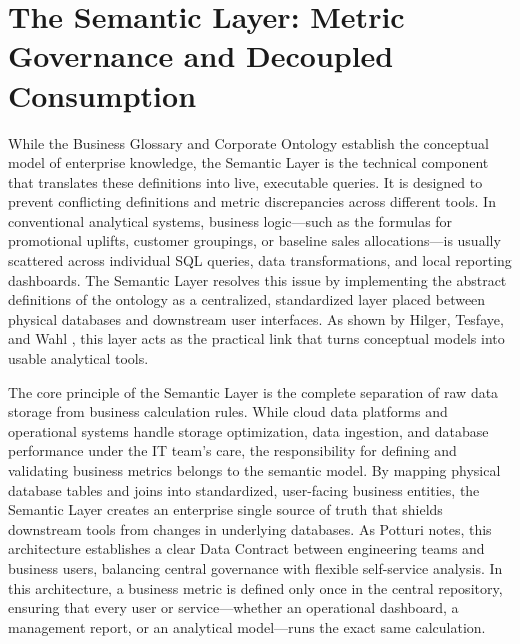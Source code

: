 \section[The Semantic Layer]{The Semantic Layer: Metric Governance and Decoupled Consumption}
\label{sec:semantic_layer}

While the Business Glossary and Corporate Ontology establish the conceptual model of enterprise knowledge, the Semantic Layer is the technical component that translates these 
definitions into live, executable queries. It is designed to prevent conflicting definitions and metric discrepancies across different tools. 
In conventional analytical systems, business logic---such as the formulas for promotional uplifts, customer groupings, or baseline sales allocations---is usually scattered 
across individual SQL queries, data transformations, and local reporting dashboards. The Semantic Layer resolves this issue by implementing the abstract definitions 
of the ontology as a centralized, standardized layer placed between physical databases and downstream user interfaces. 
As shown by Hilger, Tesfaye, and Wahl \cite{hilger2026bridging}, this layer acts as the practical link that turns conceptual models into usable analytical tools.

The core principle of the Semantic Layer is the complete separation of raw data storage from business calculation rules. While cloud data platforms and operational systems 
handle storage optimization, data ingestion, and database performance under the IT team's care, the responsibility for defining and validating business metrics 
belongs to the semantic model. By mapping physical database tables and joins into standardized, user-facing business entities, the Semantic Layer creates an enterprise 
single source of truth that shields downstream tools from changes in underlying databases. As Potturi \cite{potturi2025demystifying} notes, 
this architecture establishes a clear Data Contract between engineering teams and business users, balancing central governance with flexible self-service analysis. 
In this architecture, a business metric is defined only once in the central repository, ensuring that every user or service---whether an operational dashboard, 
a management report, or an analytical model---runs the exact same calculation.

